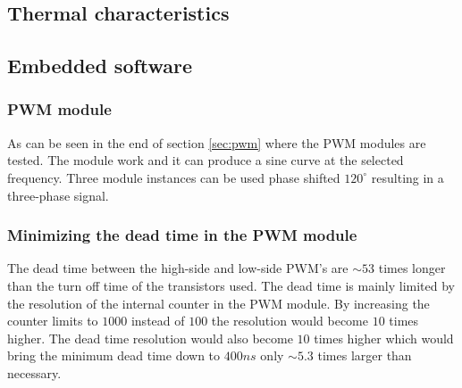 \subsection{Thermal characteristics}





\subsection{Embedded software}
\subsubsection{PWM module}
As can be seen in the end of section \ref{sec:pwm} where the PWM modules are tested. The module work and it can produce a sine curve at the selected frequency. Three module instances can be used phase shifted $120^\circ$ resulting in a three-phase signal.

\subsubsection{Minimizing the dead time in the PWM module}
The dead time between the high-side and low-side PWM's are $\sim 53$ times longer than the turn off time of the transistors used. The dead time is mainly limited by the resolution of the internal counter in the PWM module. By increasing the counter limits to $1000$ instead of $100$ the resolution would become $10$ times higher. The dead time resolution would also become $10$ times higher which would bring the minimum dead time down to $400ns$ only $\sim 5.3$ times larger than necessary.

